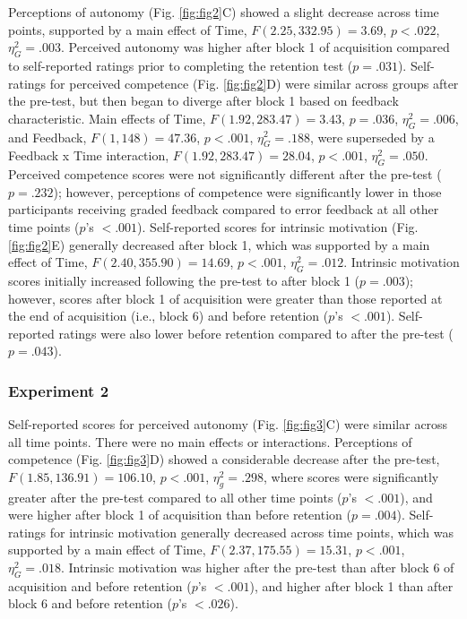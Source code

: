 \documentclass[
  man, donotrepeattitle,floatsintext]{apa7}
\begin{document}
Perceptions of autonomy (Fig. \ref{fig:fig2}C) showed a slight decrease across time points, supported by a main effect of Time, \(F(2.25,332.95) = 3.69\), \(p < .022\), \(\eta_{G}^2 = .003\). Perceived autonomy was higher after block 1 of acquisition compared to self-reported ratings prior to completing the retention test (\(p = .031\)). Self-ratings for perceived competence (Fig. \ref{fig:fig2}D) were similar across groups after the pre-test, but then began to diverge after block 1 based on feedback characteristic. Main effects of Time, \(F(1.92, 283.47) = 3.43\), \(p = .036\), \(\eta_{G}^2 = .006\), and Feedback, \(F(1,148) = 47.36\), \(p < .001\), \(\eta_{G}^2 = .188\), were superseded by a Feedback x Time interaction, \(F(1.92, 283.47) = 28.04\), \(p < .001\), \(\eta_{G}^2 = .050\). Perceived competence scores were not significantly different after the pre-test (\(p = .232\)); however, perceptions of competence were significantly lower in those participants receiving graded feedback compared to error feedback at all other time points (\(p\)'s \(< .001\)). Self-reported scores for intrinsic motivation (Fig. \ref{fig:fig2}E) generally decreased after block 1, which was supported by a main effect of Time, \(F(2.40,355.90) = 14.69\), \(p < .001\), \(\eta_{G}^2 = .012\). Intrinsic motivation scores initially increased following the pre-test to after block 1 (\(p = .003\)); however, scores after block 1 of acquisition were greater than those reported at the end of acquisition (i.e., block 6) and before retention (\(p\)'s \(< .001\)). Self-reported ratings were also lower before retention compared to after the pre-test (\(p = .043\)).

\hypertarget{experiment-2-4}{%
\subsubsection{Experiment 2}\label{experiment-2-4}}

Self-reported scores for perceived autonomy (Fig. \ref{fig:fig3}C) were similar across all time points. There were no main effects or interactions. Perceptions of competence (Fig. \ref{fig:fig3}D) showed a considerable decrease after the pre-test, \(F(1.85,136.91) = 106.10\), \(p < .001\), \(\eta_{g}^2 = .298\), where scores were significantly greater after the pre-test compared to all other time points (\(p\)'s \(< .001\)), and were higher after block 1 of acquisition than before retention (\(p = .004\)). Self-ratings for intrinsic motivation generally decreased across time points, which was supported by a main effect of Time, \(F(2.37,175.55) = 15.31\), \(p < .001\), \(\eta_{G}^2 = .018\). Intrinsic motivation was higher after the pre-test than after block 6 of acquisition and before retention (\(p\)'s \(< .001\)), and higher after block 1 than after block 6 and before retention (\(p\)'s \(< .026\)).
\end{document}
